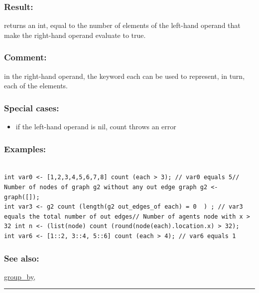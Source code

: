 \documentclass[]{book}
\providecommand{\tightlist}{%
  \setlength{\itemsep}{0pt}\setlength{\parskip}{0pt}}
\theoremstyle{definition}
\theoremstyle{definition}
\theoremstyle{definition}
\theoremstyle{remark}
\begin{document}
\subsubsection{Result:}\label{result-109}

returns an int, equal to the number of elements of the left-hand operand
that make the right-hand operand evaluate to true.

\subsubsection{Comment:}\label{comment-27}

in the right-hand operand, the keyword each can be used to represent, in
turn, each of the elements.

\subsubsection{Special cases:}\label{special-cases-41}

\begin{itemize}
\tightlist
\item
  if the left-hand operand is nil, count throws an error
\end{itemize}

\subsubsection{Examples:}\label{examples-85}

\begin{verbatim}
 
int var0 <- [1,2,3,4,5,6,7,8] count (each > 3); // var0 equals 5// Number of nodes of graph g2 without any out edge graph g2 <- graph([]);  
int var3 <- g2 count (length(g2 out_edges_of each) = 0  ) ; // var3 equals the total number of out edges// Number of agents node with x > 32 int n <- (list(node) count (round(node(each).location.x) > 32);  
int var6 <- [1::2, 3::4, 5::6] count (each > 4); // var6 equals 1
\end{verbatim}

\subsubsection{See also:}\label{see-also-69}

\href{operators-d-to-h.html\#group_by}{group\_by},

\begin{center}\rule{0.5\linewidth}{\linethickness}\end{center}
\end{document}
